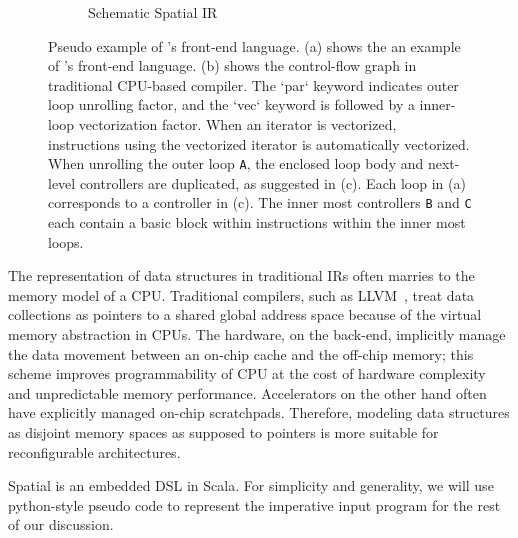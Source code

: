 \begin{figure}
\begin{subfigure}[b]{0.25\textwidth}
\caption{Schematic Spatial IR}
\end{subfigure}
\caption[Spatial Example]{
  Pseudo example of \name's front-end language.
  (a) shows the an example of \name's front-end language. 
  (b) shows the control-flow graph in traditional CPU-based compiler.
  The `par` keyword indicates outer loop unrolling factor, and
  the `vec` keyword is followed by a inner-loop vectorization factor.
  When an iterator is vectorized, instructions using the vectorized iterator is automatically
  vectorized. When unrolling the outer loop \texttt{A}, the enclosed loop body and
  next-level controllers are duplicated, as suggested in (c).
  Each loop in (a) corresponds to a controller in (c). The inner most controllers \texttt{B} and
  \texttt{C} each contain a basic block within instructions within the inner most loops.
}
\label{fig:spatialegpar}
\end{figure}

The representation of data structures in traditional IRs often marries to the memory model of a 
CPU. Traditional compilers, such as LLVM~\cite{llvm}, treat data collections as pointers to a shared
global address space because of the virtual memory abstraction in CPUs.
The hardware, on the back-end, implicitly manage the data movement between an on-chip cache and the off-chip 
memory; this scheme improves programmability of CPU at the cost of hardware complexity and
unpredictable memory
performance.
Accelerators on the other hand often have explicitly managed on-chip scratchpads.
Therefore, modeling data structures as disjoint memory spaces as supposed to pointers is more suitable for reconfigurable architectures.

Spatial is an embedded DSL in Scala.
For simplicity and generality, we will use python-style pseudo code to represent the imperative
input program for the rest of our discussion.
